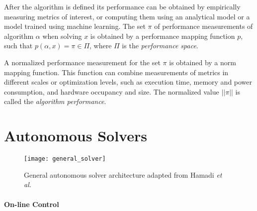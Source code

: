 After the algorithm is defined its performance can be obtained by empirically
measuring metrics of interest, or computing them using an analytical model or a
model trained using machine learning. The set $\pi$ of performance measurements
of algorithm $\alpha$ when solving $x$ is obtained by a performance mapping
function $p$, such that $p(\alpha,x) = \pi \in \Pi$, where $\Pi$ is the
\textit{performance space}.

A normalized performance measurement for the set $\pi$ is obtained by a norm
mapping function. This function can combine measurements of metrics in
different scales or optimization levels, such as execution time, memory and
power consumption, and hardware occupancy and size. The normalized value
$||\pi||$ is called the \textit{algorithm performance}.

\section{Autonomous Solvers}


\begin{figure}[htpb]
    \centering
    \texttt{[image: general\_solver]}
    \caption{General autonomous solver architecture adapted from Hamadi \emph{et al.}~\cite{hamadi2012autonomous}}
    \label{fig:general_solver}
\end{figure}

\paragraph{On-line Control}
\label{sec:oncontrol}

%
%
%

